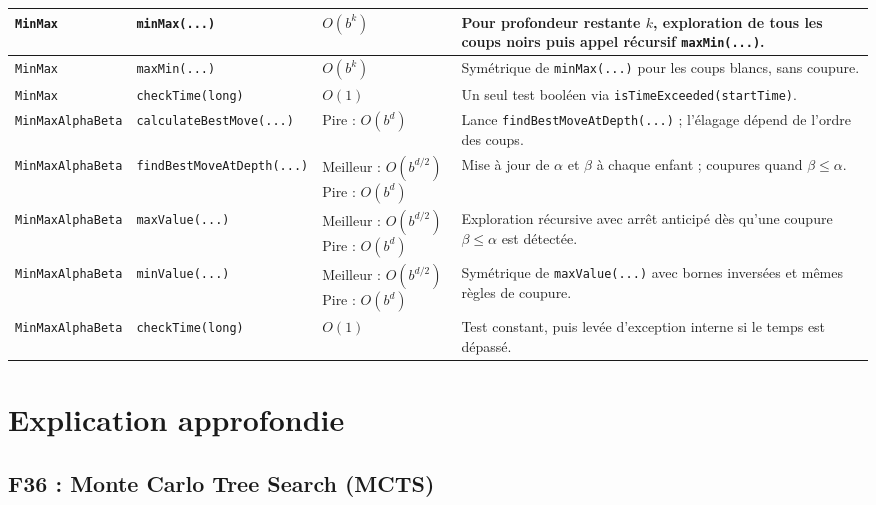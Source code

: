 \documentclass[a4paper]{article}
\begin{document}
{\begin{longtable}{|p{3.4cm}|p{4.9cm}|p{2.2cm}|p{4.8cm}|}
\texttt{MinMax}
& \texttt{minMax(...)}
& $O(b^k)$
& Pour profondeur restante \(k\), exploration de tous les coups noirs puis appel récursif \texttt{maxMin(...)}. \\
\hline

\texttt{MinMax}
& \texttt{maxMin(...)}
& $O(b^k)$
& Symétrique de \texttt{minMax(...)} pour les coups blancs, sans coupure. \\
\hline

\texttt{MinMax}
& \texttt{checkTime(long)}
& $O(1)$
& Un seul test booléen via \texttt{isTimeExceeded(startTime)}. \\
\hline


\texttt{MinMaxAlphaBeta}
& \texttt{calculateBestMove(...)}
& Pire : $O(b^d)$
& Lance \texttt{findBestMoveAtDepth(...)} ; l'élagage dépend de l'ordre des coups. \\
\hline

\texttt{MinMaxAlphaBeta}
& \texttt{findBestMoveAtDepth(...)}
& Meilleur : $O(b^{d/2})$\newline
Pire : $O(b^d)$
& Mise à jour de $\alpha$ et $\beta$ à chaque enfant ; coupures quand $\beta \leq \alpha$. \\
\hline

\texttt{MinMaxAlphaBeta}
& \texttt{maxValue(...)}
& Meilleur : $O(b^{d/2})$\newline
Pire : $O(b^d)$
& Exploration récursive avec arrêt anticipé dès qu'une coupure $\beta \leq \alpha$ est détectée. \\
\hline

\texttt{MinMaxAlphaBeta}
& \texttt{minValue(...)}
& Meilleur : $O(b^{d/2})$\newline
Pire : $O(b^d)$
& Symétrique de \texttt{maxValue(...)} avec bornes inversées et mêmes règles de coupure. \\
\hline

\texttt{MinMaxAlphaBeta}
& \texttt{checkTime(long)}
& $O(1)$
& Test constant, puis levée d'exception interne si le temps est dépassé. \\
\hline
\end{longtable}
}

\section{Explication approfondie}

\subsection{F36 : Monte Carlo Tree Search (MCTS)}
\end{document}
